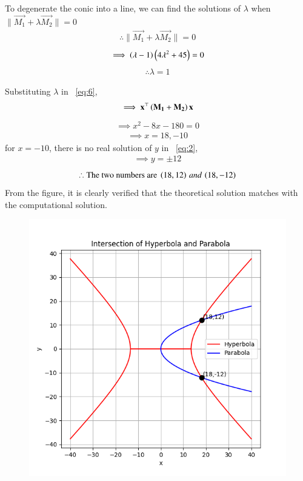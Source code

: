 \documentclass[journal]{IEEEtran}
\begin{document}
\newpage
\vspace*{0.25cm}
To degenerate the conic into a line, we can find the solutions of $\lambda$ when $\|\vec{M_1}+\lambda\vec{M_2}\|=0$ 
\begin{align}
    \therefore \|\vec{M_1}+\lambda\vec{M_2}\|=0 \label{eq:6}
\end{align}
\begin{align}
    \implies \left(\lambda-1\right)\left(4\lambda^2+45\right)=0
\end{align}
\begin{align}
    \therefore \lambda=1
\end{align}

Substituting $\lambda$ in ~\eqref{eq:6},
\begin{align}
    \implies \mathbf{x}^{\top}\left(\mathbf{M_1}+\mathbf{M_2}\right)\mathbf{x}
\end{align}
\begin{align}
    \implies x^2-8x-180=0
\end{align}
\begin{align}
    \implies x=18,-10
\end{align}
for $x=-10$, there is no real solution of $y$ in ~\eqref{eq:2},
\begin{align}
    \implies y=\pm 12
\end{align}
\begin{align}
    \therefore \text{The two numbers are }\left(18,12\right)\, and\, \left(18,-12\right)
\end{align}
From the figure, it is clearly verified that the theoretical solution matches with the computational solution.\\
\begin{figure}[H]
    \centering
    \includegraphics[width=0.6\columnwidth]{figs/Figure_1.png}
    \label{fig:1}
\end{figure}
\end{document}
